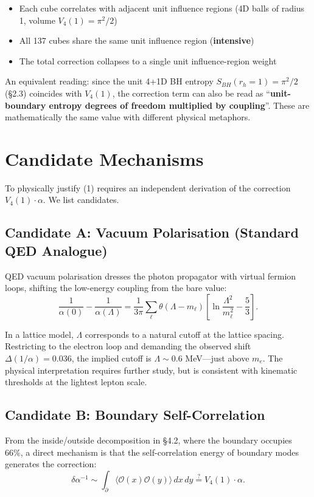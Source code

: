 \documentclass[a4paper,11pt]{article}
\begin{document}
\begin{itemize}
\item Each cube correlates with adjacent unit influence regions (4D balls of radius 1, volume $V_4(1) = \pi^2/2$)
\item All 137 cubes share the same unit influence region (\textbf{intensive})
\item The total correction collapses to a single unit influence-region weight
\end{itemize}

An equivalent reading: since the unit 4+1D BH entropy $S_{BH}(r_h=1) = \pi^2/2$ (§2.3) coincides with $V_4(1)$, the correction term can also be read as ``\textbf{unit-boundary entropy degrees of freedom multiplied by coupling}''. These are mathematically the same value with different physical metaphors.

\section{Candidate Mechanisms}

To physically justify (1) requires an independent derivation of the correction $V_4(1) \cdot \alpha$. We list candidates.

\subsection{Candidate A: Vacuum Polarisation (Standard QED Analogue)}

QED vacuum polarisation dresses the photon propagator with virtual fermion loops, shifting the low-energy coupling from the bare value:
\[ \frac{1}{\alpha(0)} - \frac{1}{\alpha(\Lambda)} = \frac{1}{3\pi}\sum_\ell \theta(\Lambda - m_\ell)\left[\ln\frac{\Lambda^2}{m_\ell^2} - \frac{5}{3}\right]. \]

In a lattice model, $\Lambda$ corresponds to a natural cutoff at the lattice spacing. Restricting to the electron loop and demanding the observed shift $\Delta(1/\alpha) = 0.036$, the implied cutoff is $\Lambda \sim 0.6$ MeV---just above $m_e$. The physical interpretation requires further study, but is consistent with kinematic thresholds at the lightest lepton scale.

\subsection{Candidate B: Boundary Self-Correlation}

From the inside/outside decomposition in §4.2, where the boundary occupies 66\%, a direct mechanism is that the self-correlation energy of boundary modes generates the correction:
\[ \delta\alpha^{-1} \sim \int_{\partial} \langle \mathcal{O}(x) \mathcal{O}(y) \rangle \, dx\, dy \stackrel{?}{=} V_4(1) \cdot \alpha. \]
\end{document}
